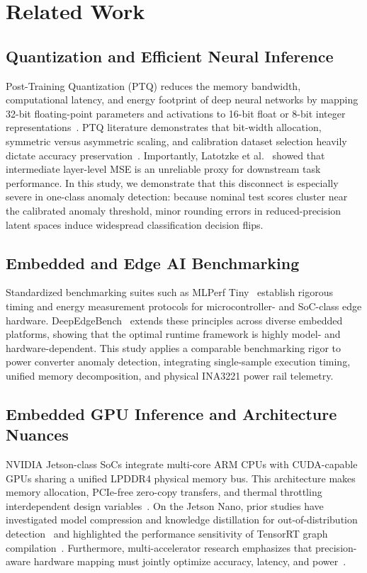 \documentclass[11pt,a4paper]{article}
\begin{document}
\section{Related Work}
\label{sec:related}

\subsection{Quantization and Efficient Neural Inference}
Post-Training Quantization (PTQ) reduces the memory bandwidth, computational latency, and energy footprint of deep neural networks by mapping 32-bit floating-point parameters and activations to 16-bit float or 8-bit integer representations~\cite{sze2017efficient,jacob2018quantization,gholami2022quantsurvey}. PTQ literature demonstrates that bit-width allocation, symmetric versus asymmetric scaling, and calibration dataset selection heavily dictate accuracy preservation~\cite{latotzke2022posttraining}. Importantly, Latotzke et al.~\cite{latotzke2022posttraining} showed that intermediate layer-level MSE is an unreliable proxy for downstream task performance. In this study, we demonstrate that this disconnect is especially severe in one-class anomaly detection: because nominal test scores cluster near the calibrated anomaly threshold, minor rounding errors in reduced-precision latent spaces induce widespread classification decision flips.

\subsection{Embedded and Edge AI Benchmarking}
Standardized benchmarking suites such as MLPerf Tiny~\cite{banbury2021mlperftiny} establish rigorous timing and energy measurement protocols for microcontroller- and SoC-class edge hardware. DeepEdgeBench~\cite{baller2021deepedgebench} extends these principles across diverse embedded platforms, showing that the optimal runtime framework is highly model- and hardware-dependent. This study applies a comparable benchmarking rigor to power converter anomaly detection, integrating single-sample execution timing, unified memory decomposition, and physical INA3221 power rail telemetry.

\subsection{Embedded GPU Inference and Architecture Nuances}
NVIDIA Jetson-class SoCs integrate multi-core ARM CPUs with CUDA-capable GPUs sharing a unified LPDDR4 physical memory bus. This architecture makes memory allocation, PCIe-free zero-copy transfers, and thermal throttling interdependent design variables~\cite{swaminathan2024benchmarking}. On the Jetson Nano, prior studies have investigated model compression and knowledge distillation for out-of-distribution detection~\cite{bansal2024compressing} and highlighted the performance sensitivity of TensorRT graph compilation~\cite{swaminathan2024benchmarking}. Furthermore, multi-accelerator research emphasizes that precision-aware hardware mapping must jointly optimize accuracy, latency, and power~\cite{risso2024precisionaware}.
\end{document}
